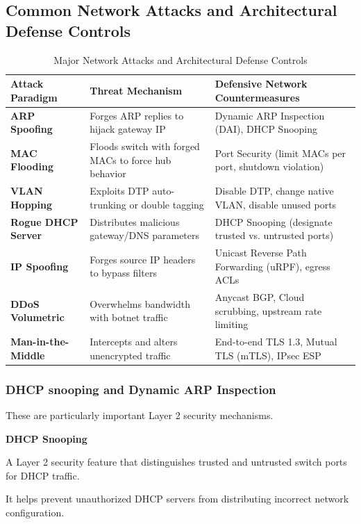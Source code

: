 \subsection{Common Network Attacks and Architectural Defense Controls}
\begin{table}[htbp]
\centering
\caption{Major Network Attacks and Architectural Defense Controls}
\label{tab:network_attacks_defenses}
\begin{tabularx}{\textwidth}{p{3.2cm} X X}
\toprule
\textbf{Attack Paradigm} & \textbf{Threat Mechanism} & \textbf{Defensive Network Countermeasures} \\
\midrule
\textbf{ARP Spoofing} & Forges ARP replies to hijack gateway IP & Dynamic ARP Inspection (DAI), DHCP Snooping \\
\textbf{MAC Flooding} & Floods switch with forged MACs to force hub behavior & Port Security (limit MACs per port, shutdown violation) \\
\textbf{VLAN Hopping} & Exploits DTP auto-trunking or double tagging & Disable DTP, change native VLAN, disable unused ports \\
\textbf{Rogue DHCP Server} & Distributes malicious gateway/DNS parameters & DHCP Snooping (designate trusted vs. untrusted ports) \\
\textbf{IP Spoofing} & Forges source IP headers to bypass filters & Unicast Reverse Path Forwarding (uRPF), egress ACLs \\
\textbf{DDoS Volumetric} & Overwhelms bandwidth with botnet traffic & Anycast BGP, Cloud scrubbing, upstream rate limiting \\
\textbf{Man-in-the-Middle} & Intercepts and alters unencrypted traffic & End-to-end TLS 1.3, Mutual TLS (mTLS), IPsec ESP \\
\bottomrule
\end{tabularx}
\end{table}


\subsubsection{DHCP snooping and Dynamic ARP Inspection}

These are particularly important Layer 2 security mechanisms.

\textbf{DHCP Snooping}

A Layer 2 security feature that distinguishes trusted and untrusted switch ports for DHCP traffic.

It helps prevent unauthorized DHCP servers from distributing incorrect network configuration.

